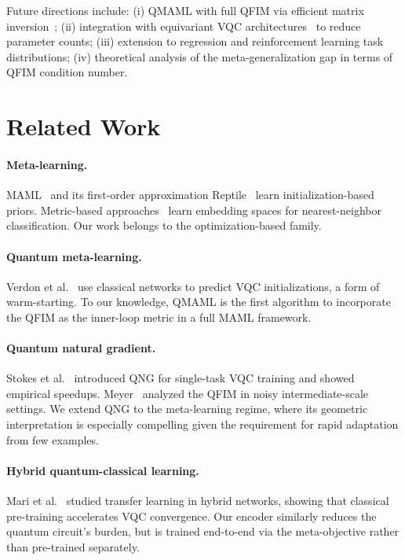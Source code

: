 \documentclass[a4paper,nopdfoutputerror]{quantumarticle}
\begin{document}
Future directions include:
(i) QMAML with full QFIM via efficient matrix inversion~\cite{stokes2020quantum};
(ii) integration with equivariant VQC
architectures~\cite{skolik2022equivariant} to reduce parameter counts;
(iii) extension to regression and reinforcement learning task distributions;
(iv) theoretical analysis of the meta-generalization gap in terms of QFIM
condition number.

\section{Related Work}
\label{sec:related}

\paragraph{Meta-learning.}
MAML~\cite{finn2017maml} and its first-order approximation
Reptile~\cite{nichol2018reptile} learn initialization-based priors.
Metric-based approaches~\cite{vinyals2016matching,snell2017prototypical}
learn embedding spaces for nearest-neighbor classification.
Our work belongs to the optimization-based family.

\paragraph{Quantum meta-learning.}
Verdon et al.~\cite{verdon2019learning} use classical networks to predict
VQC initializations, a form of warm-starting.
To our knowledge, QMAML is the first algorithm to incorporate
the QFIM as the inner-loop metric in a full MAML framework.

\paragraph{Quantum natural gradient.}
Stokes et al.~\cite{stokes2020quantum} introduced QNG for single-task VQC
training and showed empirical speedups.
Meyer~\cite{meyer2021fisher} analyzed the QFIM in noisy intermediate-scale
settings.
We extend QNG to the meta-learning regime, where its geometric
interpretation is especially compelling given the requirement for
rapid adaptation from few examples.

\paragraph{Hybrid quantum-classical learning.}
Mari et al.~\cite{mari2020transfer} studied transfer learning in hybrid
networks, showing that classical pre-training accelerates VQC convergence.
Our encoder similarly reduces the quantum circuit's burden, but is trained
end-to-end via the meta-objective rather than pre-trained separately.
\end{document}
